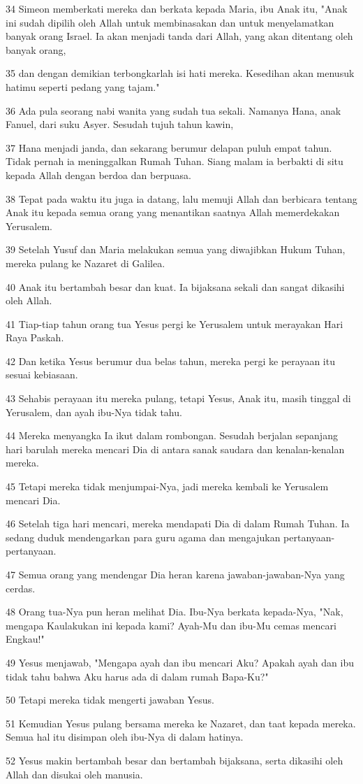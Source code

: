 \par 34 Simeon memberkati mereka dan berkata kepada Maria, ibu Anak itu, "Anak ini sudah dipilih oleh Allah untuk membinasakan dan untuk menyelamatkan banyak orang Israel. Ia akan menjadi tanda dari Allah, yang akan ditentang oleh banyak orang,
\par 35 dan dengan demikian terbongkarlah isi hati mereka. Kesedihan akan menusuk hatimu seperti pedang yang tajam."
\par 36 Ada pula seorang nabi wanita yang sudah tua sekali. Namanya Hana, anak Fanuel, dari suku Asyer. Sesudah tujuh tahun kawin,
\par 37 Hana menjadi janda, dan sekarang berumur delapan puluh empat tahun. Tidak pernah ia meninggalkan Rumah Tuhan. Siang malam ia berbakti di situ kepada Allah dengan berdoa dan berpuasa.
\par 38 Tepat pada waktu itu juga ia datang, lalu memuji Allah dan berbicara tentang Anak itu kepada semua orang yang menantikan saatnya Allah memerdekakan Yerusalem.
\par 39 Setelah Yusuf dan Maria melakukan semua yang diwajibkan Hukum Tuhan, mereka pulang ke Nazaret di Galilea.
\par 40 Anak itu bertambah besar dan kuat. Ia bijaksana sekali dan sangat dikasihi oleh Allah.
\par 41 Tiap-tiap tahun orang tua Yesus pergi ke Yerusalem untuk merayakan Hari Raya Paskah.
\par 42 Dan ketika Yesus berumur dua belas tahun, mereka pergi ke perayaan itu sesuai kebiasaan.
\par 43 Sehabis perayaan itu mereka pulang, tetapi Yesus, Anak itu, masih tinggal di Yerusalem, dan ayah ibu-Nya tidak tahu.
\par 44 Mereka menyangka Ia ikut dalam rombongan. Sesudah berjalan sepanjang hari barulah mereka mencari Dia di antara sanak saudara dan kenalan-kenalan mereka.
\par 45 Tetapi mereka tidak menjumpai-Nya, jadi mereka kembali ke Yerusalem mencari Dia.
\par 46 Setelah tiga hari mencari, mereka mendapati Dia di dalam Rumah Tuhan. Ia sedang duduk mendengarkan para guru agama dan mengajukan pertanyaan-pertanyaan.
\par 47 Semua orang yang mendengar Dia heran karena jawaban-jawaban-Nya yang cerdas.
\par 48 Orang tua-Nya pun heran melihat Dia. Ibu-Nya berkata kepada-Nya, "Nak, mengapa Kaulakukan ini kepada kami? Ayah-Mu dan ibu-Mu cemas mencari Engkau!"
\par 49 Yesus menjawab, "Mengapa ayah dan ibu mencari Aku? Apakah ayah dan ibu tidak tahu bahwa Aku harus ada di dalam rumah Bapa-Ku?"
\par 50 Tetapi mereka tidak mengerti jawaban Yesus.
\par 51 Kemudian Yesus pulang bersama mereka ke Nazaret, dan taat kepada mereka. Semua hal itu disimpan oleh ibu-Nya di dalam hatinya.
\par 52 Yesus makin bertambah besar dan bertambah bijaksana, serta dikasihi oleh Allah dan disukai oleh manusia.

